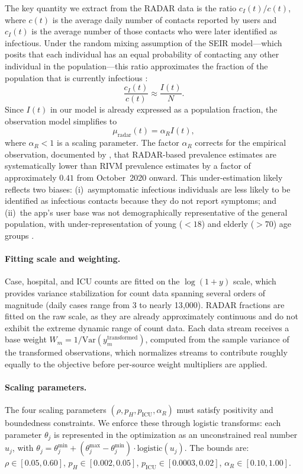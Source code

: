 \documentclass[11pt]{article}
\begin{document}
The key quantity we extract from the RADAR data is the ratio $c_I(t)/c(t)$, where $c(t)$ is the average daily number of contacts reported by users and $c_I(t)$ is the average number of those contacts who were later identified as infectious. Under the random mixing assumption of the SEIR model---which posits that each individual has an equal probability of contacting any other individual in the population---this ratio approximates the fraction of the population that is currently infectious \citep{SchootUiterkamp2025}:
\begin{equation}\label{eq:radar-theory}
  \frac{c_I(t)}{c(t)} \approx \frac{I(t)}{N}.
\end{equation}
Since $I(t)$ in our model is already expressed as a population fraction, the observation model simplifies to
\begin{equation}\label{eq:obs-radar}
  \mu_{\mathrm{radar}}(t) = \alpha_R I(t),
\end{equation}
where $\alpha_R < 1$ is a scaling parameter. The factor $\alpha_R$ corrects for the empirical observation, documented by \citet{SchootUiterkamp2025}, that RADAR-based prevalence estimates are systematically lower than RIVM prevalence estimates by a factor of approximately $0.41$ from October~2020 onward. This under-estimation likely reflects two biases: (i)~asymptomatic infectious individuals are less likely to be identified as infectious contacts because they do not report symptoms; and (ii)~the app's user base was not demographically representative of the general population, with under-representation of young ($<18$) and elderly ($>70$) age groups \citep{vanDijk2021}.

\paragraph{Fitting scale and weighting.}
Case, hospital, and ICU counts are fitted on the $\log(1+y)$ scale, which provides variance stabilization for count data spanning several orders of magnitude (daily cases range from 3 to nearly 13{,}000). RADAR fractions are fitted on the raw scale, as they are already approximately continuous and do not exhibit the extreme dynamic range of count data. Each data stream receives a base weight $W_m = 1/\mathrm{Var}(y_m^{\mathrm{transformed}})$, computed from the sample variance of the transformed observations, which normalizes streams to contribute roughly equally to the objective before per-source weight multipliers are applied.

\paragraph{Scaling parameters.}
The four scaling parameters $(\rho, p_H, p_{\mathrm{ICU}}, \alpha_R)$ must satisfy positivity and boundedness constraints. We enforce these through logistic transforms: each parameter $\theta_j$ is represented in the optimization as an unconstrained real number $u_j$, with $\theta_j = \theta_j^{\min} + (\theta_j^{\max} - \theta_j^{\min}) \cdot \text{logistic}(u_j)$. The bounds are: $\rho \in [0.05, 0.60]$, $p_H \in [0.002, 0.05]$, $p_{\mathrm{ICU}} \in [0.0003, 0.02]$, $\alpha_R \in [0.10, 1.00]$.
\end{document}
